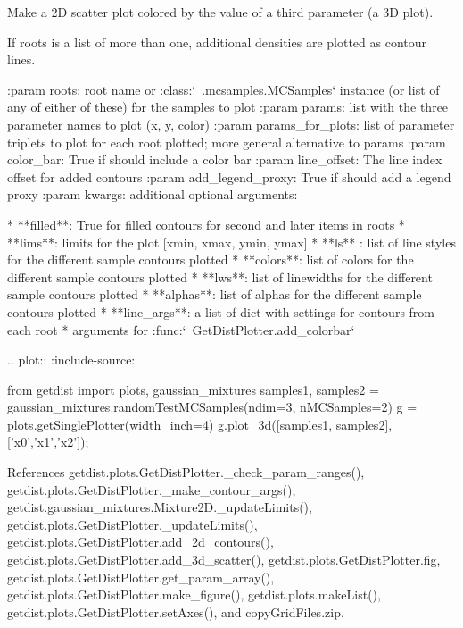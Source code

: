 \begin{DoxyVerb}Make a 2D scatter plot colored by the value of a third parameter (a 3D plot).

If roots is a list of more than one, additional densities are plotted as contour lines. 

:param roots: root name or :class:`~.mcsamples.MCSamples` instance (or list of any of either of these) for the samples to plot
:param params: list with the three parameter names to plot (x, y, color)
:param params_for_plots: list of parameter triplets to plot for each root plotted; more general alternative to params
:param color_bar: True if should include a color bar
:param line_offset: The line index offset for added contours
:param add_legend_proxy: True if should add a legend proxy
:param kwargs: additional optional arguments:

* **filled**: True for filled contours for second and later items in roots
* **lims**: limits for the plot [xmin, xmax, ymin, ymax]
* **ls** : list of line styles for the different sample contours plotted 
* **colors**: list of colors for the different sample contours plotted 
* **lws**: list of linewidths for the different sample contours plotted
* **alphas**: list of alphas for the different sample contours plotted 
* **line_args**: a list of dict with settings for contours from each root
* arguments for :func:`~GetDistPlotter.add_colorbar`

.. plot::
   :include-source:
   
    from getdist import plots, gaussian_mixtures
    samples1, samples2 = gaussian_mixtures.randomTestMCSamples(ndim=3, nMCSamples=2)
    g = plots.getSinglePlotter(width_inch=4)
    g.plot_3d([samples1, samples2], ['x0','x1','x2']);
\end{DoxyVerb}
 

References getdist.\+plots.\+Get\+Dist\+Plotter.\+\_\+check\+\_\+param\+\_\+ranges(), getdist.\+plots.\+Get\+Dist\+Plotter.\+\_\+make\+\_\+contour\+\_\+args(), getdist.\+gaussian\+\_\+mixtures.\+Mixture2\+D.\+\_\+update\+Limits(), getdist.\+plots.\+Get\+Dist\+Plotter.\+\_\+update\+Limits(), getdist.\+plots.\+Get\+Dist\+Plotter.\+add\+\_\+2d\+\_\+contours(), getdist.\+plots.\+Get\+Dist\+Plotter.\+add\+\_\+3d\+\_\+scatter(), getdist.\+plots.\+Get\+Dist\+Plotter.\+fig, getdist.\+plots.\+Get\+Dist\+Plotter.\+get\+\_\+param\+\_\+array(), getdist.\+plots.\+Get\+Dist\+Plotter.\+make\+\_\+figure(), getdist.\+plots.\+make\+List(), getdist.\+plots.\+Get\+Dist\+Plotter.\+set\+Axes(), and copy\+Grid\+Files.\+zip.



